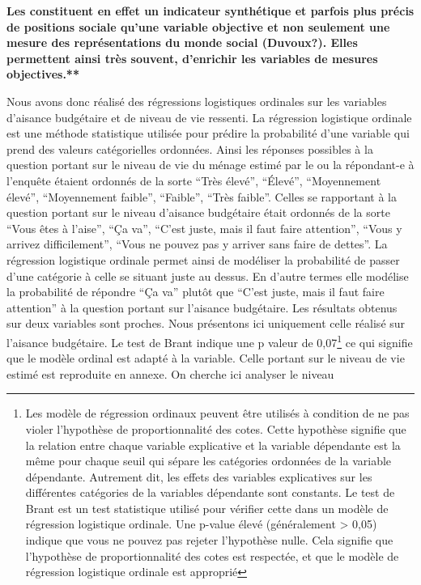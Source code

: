 \documentclass[
  12pt,
]{book}
\begin{document}
\textbf{Les constituent en effet un indicateur synthétique et parfois
plus précis de positions sociale qu'une variable objective et non
seulement une mesure des représentations du monde social
(\textbf{Duvoux?}). Elles permettent ainsi très souvent, d'enrichir les
variables de mesures objectives.**}

Nous avons donc réalisé des régressions logistiques ordinales sur les
variables d'aisance budgétaire et de niveau de vie ressenti. La
régression logistique ordinale est une méthode statistique utilisée pour
prédire la probabilité d'une variable qui prend des valeurs
catégorielles ordonnées. Ainsi les réponses possibles à la question
portant sur le niveau de vie du ménage estimé par le ou la répondant-e à
l'enquête étaient ordonnés de la sorte ``Très élevé'', ``Élevé'',
``Moyennement élevé'', ``Moyennement faible'', ``Faible'', ``Très
faible''. Celles se rapportant à la question portant sur le niveau
d'aisance budgétaire était ordonnés de la sorte ``Vous êtes à l'aise'',
``Ça va'', ``C'est juste, mais il faut faire attention'', ``Vous y
arrivez difficilement'', ``Vous ne pouvez pas y arriver sans faire de
dettes''. La régression logistique ordinale permet ainsi de modéliser la
probabilité de passer d'une catégorie à celle se situant juste au
dessus. En d'autre termes elle modélise la probabilité de répondre ``Ça
va'' plutôt que ``C'est juste, mais il faut faire attention'' à la
question portant sur l'aisance budgétaire. Les résultats obtenus sur
deux variables sont proches. Nous présentons ici uniquement celle
réalisé sur l'aisance budgétaire. Le test de Brant indique une p valeur
de 0,07\footnote{Les modèle de régression ordinaux peuvent être utilisés
  à condition de ne pas violer l'hypothèse de proportionnalité des
  cotes. Cette hypothèse signifie que la relation entre chaque variable
  explicative et la variable dépendante est la même pour chaque seuil
  qui sépare les catégories ordonnées de la variable dépendante.
  Autrement dit, les effets des variables explicatives sur les
  différentes catégories de la variables dépendante sont constants. Le
  test de Brant est un test statistique utilisé pour vérifier cette dans
  un modèle de régression logistique ordinale. Une p-value élevé
  (généralement \textgreater{} 0,05) indique que vous ne pouvez pas
  rejeter l'hypothèse nulle. Cela signifie que l'hypothèse de
  proportionnalité des cotes est respectée, et que le modèle de
  régression logistique ordinale est approprié} ce qui signifie que le
modèle ordinal est adapté à la variable. Celle portant sur le niveau de
vie estimé est reproduite en annexe. On cherche ici analyser le niveau
\end{document}
